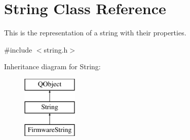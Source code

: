 \hypertarget{classString}{}\section{String Class Reference}
\label{classString}


This is the representation of a string with their properties.  




{\ttfamily \#include $<$string.\+h$>$}

Inheritance diagram for String\+:\begin{figure}[H]
\begin{center}
\leavevmode
\includegraphics[height=3.000000cm]{classString}
\end{center}
\end{figure}

